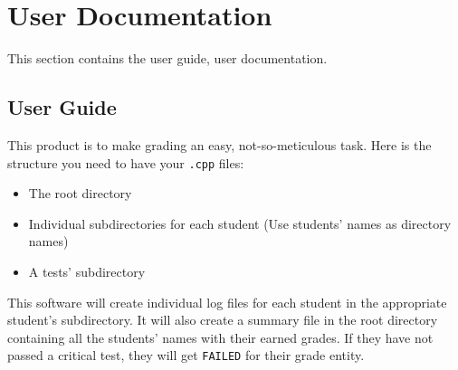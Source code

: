 
\chapter{User Documentation}

This section contains the user guide, user documentation.


\section{User Guide}

This product is to make grading an easy, not-so-meticulous task. Here is the structure you need to have your {\tt .cpp} files:

	\begin{itemize} 
  		\item The root directory
  		\item Individual subdirectories for each student (Use students' names as directory names)
  		\item A tests' subdirectory
	\end{itemize} 
	
This software will create individual log files for each student in the appropriate student's subdirectory. It will also create a summary file in the root directory containing all the students' names with their earned grades. If they have not passed a critical test, they will get {\tt FAILED} for their grade entity.
	


